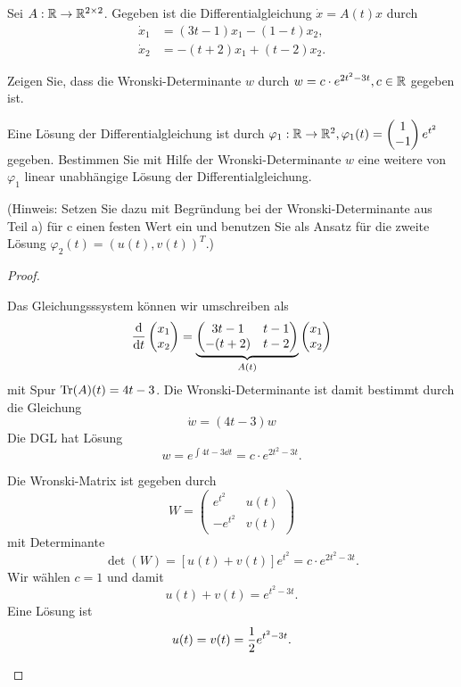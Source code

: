 \begin{Problem}
	Sei $A:\mathbb{R}\to \mathbb{R}^{2\times 2}$. Gegeben ist die Differentialgleichung $\dot{x} = A(t)x$ durch
	\begin{align*}
		\dot{x}_1&= (3t-1)x_1-(1-t)x_2,\\
		\dot{x}_2&= -(t+2)x_1 + (t-2)x_2.
	\end{align*}
	\begin{parts}
		\item  Zeigen Sie, dass die Wronski-Determinante $w$ durch $w = c\cdot e^{2t^2-3t}, c \in \mathbb{R}$ gegeben ist.
		\item Eine Lösung der Differentialgleichung ist durch $\varphi_1 : \mathbb{R} \to \mathbb{R}^2 , \varphi_1 (t) =
		\begin{pmatrix} 1 \\ -1 \end{pmatrix}e^{t^2}$ gegeben. Bestimmen Sie mit Hilfe der Wronski-Determinante $w$ eine weitere von $\varphi_1$ linear unabhängige Lösung der Differentialgleichung.
		
		(Hinweis: Setzen Sie dazu mit Begründung bei der Wronski-Determinante aus Teil a) für c einen festen Wert ein und benutzen Sie als Ansatz für die zweite Lösung $\varphi_2 (t) = (u(t), v(t))^T$.)
	\end{parts}
\end{Problem}
\begin{proof}
	\begin{parts}
		\item Das Gleichungsssystem können wir umschreiben als
		\[\dv{t}\begin{pmatrix} x_1 \\ x_2\end{pmatrix}= \underbrace{\begin{pmatrix}
		3t-1 & t-1 \\
		-(t+2) & t-2 
		\end{pmatrix}}_{A(t)}
		\begin{pmatrix}
			x_1\\
			x_2
		\end{pmatrix}\]
		mit Spur $\Tr(A)(t)=4t-3$. Die Wronski-Determinante ist damit bestimmt durch die Gleichung
		\[\dot{w}=(4t-3)w\]
		Die DGL hat L\"{o}sung
		\[w = e^{\int 4t-3 \dd{t}}=c\cdot e^{2t^2 - 3t}.\]
		\item Die Wronski-Matrix ist gegeben durch
		\[W = \begin{pmatrix}
			e^{t^2} & u(t)\\
			-e^{t^2} & v(t)
		\end{pmatrix}\]
	mit Determinante
	\[\det(W)= [u(t)+v(t)]e^{t^2}=c \cdot e^{2t^2 - 3t}.\]
	Wir wählen $c=1$ und damit
	\[u(t)+v(t) = e^{t^2 - 3t}.\]
	Eine L\"{o}sung ist
	\[u(t)=v(t) = \frac 12 e^{t^2-3t}.\qedhere\]
	\end{parts}
\end{proof}

